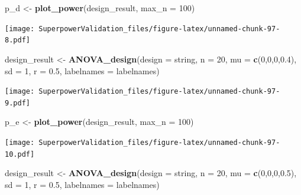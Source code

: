\documentclass[]{book}
\newenvironment{Shaded}{\begin{snugshade}}{\end{snugshade}}
\newcommand{\DataTypeTok}[1]{\textcolor[rgb]{0.13,0.29,0.53}{#1}}
\newcommand{\DecValTok}[1]{\textcolor[rgb]{0.00,0.00,0.81}{#1}}
\newcommand{\FloatTok}[1]{\textcolor[rgb]{0.00,0.00,0.81}{#1}}
\newcommand{\KeywordTok}[1]{\textcolor[rgb]{0.13,0.29,0.53}{\textbf{#1}}}
\newcommand{\NormalTok}[1]{#1}
\newcommand{\StringTok}[1]{\textcolor[rgb]{0.31,0.60,0.02}{#1}}
\begin{document}
\begin{Shaded}
\begin{Highlighting}[]
\NormalTok{p_d <-}\StringTok{ }\KeywordTok{plot_power}\NormalTok{(design_result,}
                      \DataTypeTok{max_n =} \DecValTok{100}\NormalTok{)}
\end{Highlighting}
\end{Shaded}

\texttt{[image: SuperpowerValidation\_files/figure-latex/unnamed-chunk-97-8.pdf]}

\begin{Shaded}
\begin{Highlighting}[]
\NormalTok{design_result <-}\StringTok{ }\KeywordTok{ANOVA_design}\NormalTok{(}\DataTypeTok{design =}\NormalTok{ string,}
                              \DataTypeTok{n =} \DecValTok{20}\NormalTok{, }
                              \DataTypeTok{mu =} \KeywordTok{c}\NormalTok{(}\DecValTok{0}\NormalTok{,}\DecValTok{0}\NormalTok{,}\DecValTok{0}\NormalTok{,}\FloatTok{0.4}\NormalTok{), }
                              \DataTypeTok{sd =} \DecValTok{1}\NormalTok{, }
                              \DataTypeTok{r =} \FloatTok{0.5}\NormalTok{, }
                              \DataTypeTok{labelnames =}\NormalTok{ labelnames)}
\end{Highlighting}
\end{Shaded}

\texttt{[image: SuperpowerValidation\_files/figure-latex/unnamed-chunk-97-9.pdf]}

\begin{Shaded}
\begin{Highlighting}[]
\NormalTok{p_e <-}\StringTok{ }\KeywordTok{plot_power}\NormalTok{(design_result,}
                      \DataTypeTok{max_n =} \DecValTok{100}\NormalTok{)}
\end{Highlighting}
\end{Shaded}

\texttt{[image: SuperpowerValidation\_files/figure-latex/unnamed-chunk-97-10.pdf]}

\begin{Shaded}
\begin{Highlighting}[]
\NormalTok{design_result <-}\StringTok{ }\KeywordTok{ANOVA_design}\NormalTok{(}\DataTypeTok{design =}\NormalTok{ string,}
                              \DataTypeTok{n =} \DecValTok{20}\NormalTok{, }
                              \DataTypeTok{mu =} \KeywordTok{c}\NormalTok{(}\DecValTok{0}\NormalTok{,}\DecValTok{0}\NormalTok{,}\DecValTok{0}\NormalTok{,}\FloatTok{0.5}\NormalTok{), }
                              \DataTypeTok{sd =} \DecValTok{1}\NormalTok{, }
                              \DataTypeTok{r =} \FloatTok{0.5}\NormalTok{, }
                              \DataTypeTok{labelnames =}\NormalTok{ labelnames)}
\end{Highlighting}
\end{Shaded}
\end{document}
